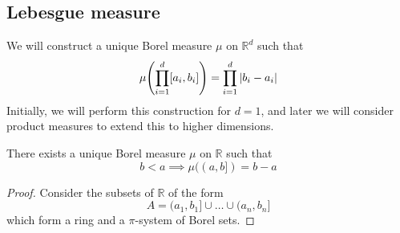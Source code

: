 \subsection{Lebesgue measure}
We will construct a unique Borel measure \( \mu \) on \( \mathbb R^d \) such that
\[ \mu\qty(\prod_{i=1}^d [a_i, b_i]) = \prod_{i=1}^d \abs{b_i - a_i} \]
Initially, we will perform this construction for \( d = 1 \), and later we will consider product measures to extend this to higher dimensions.
\begin{theorem}
	There exists a unique Borel measure \( \mu \) on \( \mathbb R \) such that
	\[ b < a \implies \mu((a,b]) = b - a \]
\end{theorem}
\begin{proof}
	Consider the subsets of \( \mathbb R \) of the form
	\[ A = (a_1,b_1] \cup \dots \cup (a_n,b_n] \]
	which form a ring and a \( \pi \)-system of Borel sets.
\end{proof}
